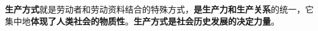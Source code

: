 \textbf{{生产方式}}{就是劳动者和劳动资料结合的特殊方式，}\textbf{{是生产力和生产关系}}{的统一，它集中地}\textbf{{体现了人类社会的物质性}}{。}\textbf{{生产方式是社会历史发展的决定力量}}{。}
